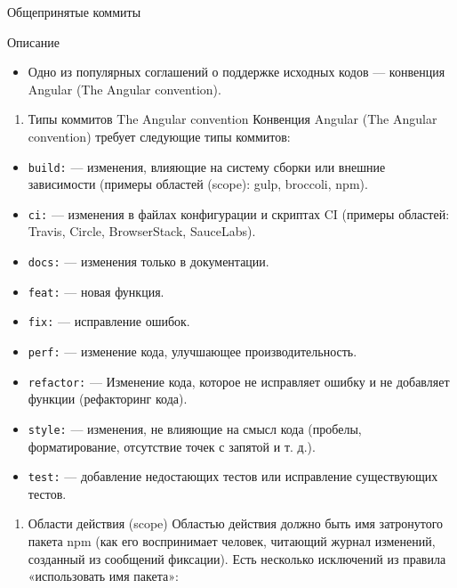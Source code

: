 \documentclass[
  ignorenonframetext,
  aspectratio=169,
  russian,
]{beamer}
\providecommand{\tightlist}{%
  \setlength{\itemsep}{0pt}\setlength{\parskip}{0pt}}
\begin{document}
\begin{frame}[fragile]{Общепринятые коммиты}
\begin{block}{Описание}
\begin{itemize}[<+->]
\begin{enumerate}[<+->]
\begin{enumerate}[<+->]
      \begin{itemize}[<+->]
      \tightlist
      \item
        Одно из популярных соглашений о поддержке исходных кодов ---
        конвенция Angular (The Angular convention).
      \end{itemize}

      \begin{enumerate}[<+->]
      \tightlist
      \item
        Типы коммитов The Angular convention Конвенция Angular (The
        Angular convention) требует следующие типы коммитов:
      \end{enumerate}

      \begin{itemize}[<+->]
      \tightlist
      \item
        \texttt{build:} --- изменения, влияющие на систему сборки или
        внешние зависимости (примеры областей (scope): gulp, broccoli,
        npm).
      \item
        \texttt{ci:} --- изменения в файлах конфигурации и скриптах CI
        (примеры областей: Travis, Circle, BrowserStack, SauceLabs).
      \item
        \texttt{docs:} --- изменения только в документации.
      \item
        \texttt{feat:} --- новая функция.
      \item
        \texttt{fix:} --- исправление ошибок.
      \item
        \texttt{perf:} --- изменение кода, улучшающее
        производительность.
      \item
        \texttt{refactor:} --- Изменение кода, которое не исправляет
        ошибку и не добавляет функции (рефакторинг кода).
      \item
        \texttt{style:} --- изменения, не влияющие на смысл кода
        (пробелы, форматирование, отсутствие точек с запятой и т. д.).
      \item
        \texttt{test:} --- добавление недостающих тестов или исправление
        существующих тестов.
      \end{itemize}

      \begin{enumerate}[<+->]
      \tightlist
      \item
        Области действия (scope) Областью действия должно быть имя
        затронутого пакета npm (как его воспринимает человек, читающий
        журнал изменений, созданный из сообщений фиксации). Есть
        несколько исключений из правила «использовать имя пакета»:
      \end{enumerate}


\end{enumerate}
\end{enumerate}
\end{itemize}
\end{block}
\end{frame}
\end{document}
